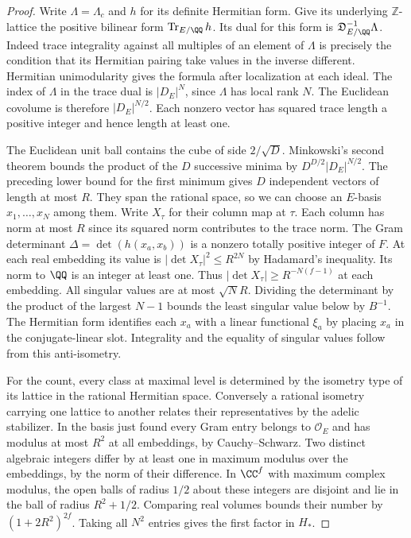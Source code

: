 \documentclass[a4paper,11pt]{article}
\theoremstyle{definition}
\theoremstyle{remark}
\newcommand{\ZZ}{\mathbb Z}\newcommand{\ord}{\operatorname{ord}}
\numberwithin{equation}{section}
\begin{document}
\begin{proof}
Write \(\Lambda=\Lambda_c\) and \(h\) for its definite Hermitian
form. Give its underlying \(\ZZ\)-lattice the positive bilinear
form \(\operatorname{Tr}_{E/\QQ}h\). Its dual for this form is
\(\mathfrak D_{E/\QQ}^{-1}\Lambda\). Indeed trace integrality
against all multiples of an element of \(\Lambda\) is precisely
the condition that its Hermitian pairing take values in the
inverse different. Hermitian unimodularity gives the formula
after localization at each ideal. The index of \(\Lambda\)
in the trace dual is \(|D_E|^N\), since \(\Lambda\) has local
rank \(N\). The Euclidean covolume is therefore
\(|D_E|^{N/2}\). Each nonzero vector has squared trace length a
positive integer and hence length at least one.

The Euclidean unit ball contains the cube of side \(2/\sqrt D\).
Minkowski's second theorem bounds the product of the \(D\)
successive minima by \(D^{D/2}|D_E|^{N/2}\). The preceding
lower bound for the first minimum gives \(D\) independent
vectors of length at most \(R\). They span the rational space,
so we can choose an \(E\)-basis \(x_1,\ldots,x_N\) among them.
Write \(X_\tau\) for their column map at \(\tau\). Each column
has norm at most \(R\) since its squared norm contributes to
the trace norm. The Gram determinant
\(\Delta=\det(h(x_a,x_b))\) is a nonzero totally positive
integer of \(F\). At each real embedding its value is
\(|\det X_\tau|^2\le R^{2N}\) by Hadamard's inequality.
Its norm to \(\QQ\) is an integer at least one. Thus
\(|\det X_\tau|\ge R^{-N(f-1)}\) at each embedding. All
singular values are at most \(\sqrt N R\). Dividing the
determinant by the product of the largest \(N-1\) bounds the
least singular value below by \(B^{-1}\). The Hermitian form
identifies each \(x_a\) with a linear functional \(\xi_a\) by
placing \(x_a\) in the conjugate-linear slot. Integrality and
the equality of singular values follow from this anti-isometry.

For the count, every class at maximal level is determined by
the isometry type of its lattice in the rational Hermitian
space. Conversely a rational isometry carrying one lattice to
another relates their representatives by the adelic stabilizer.
In the basis just found every Gram entry belongs to
\(\mathcal O_E\) and has modulus at most \(R^2\) at all
embeddings, by Cauchy--Schwarz. Two distinct algebraic integers
differ by at least one in maximum modulus over the embeddings,
by the norm of their difference. In \(\CC^f\) with maximum
complex modulus, the open balls of radius \(1/2\) about these
integers are disjoint and lie in the ball of radius \(R^2+1/2\).
Comparing real volumes bounds their number by
\((1+2R^2)^{2f}\). Taking all \(N^2\) entries gives the first
factor in \(H_*\).


\end{proof}
\end{document}
